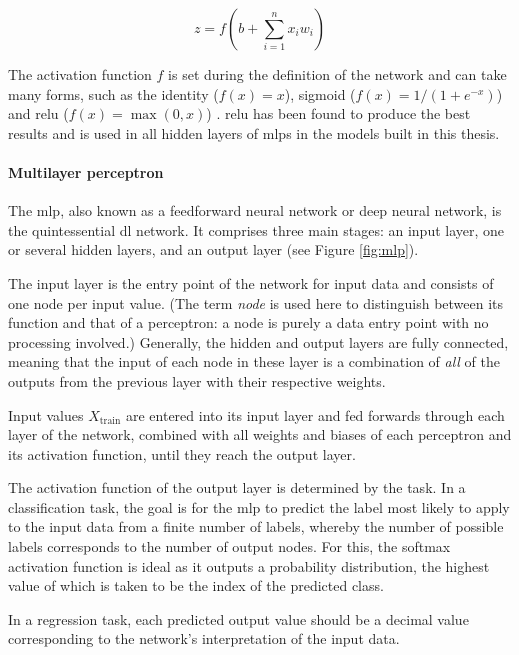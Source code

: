 \[
    z = f\left(b + \sum_{i = 1}^{n}x_{i}w_{i}\right)
\]



The activation function \(f\) is set during the definition of the network and can take many forms, such as the identity (\(f\left(x\right) = x\)), sigmoid (\(f\left(x\right) = 1 / \left(1 + e^{-x}\right)\)) and \ac{relu} (\(f\left(x\right) = \max\left(0, x\right)\)) \cite[]{hahnloser_digital_2000}. \ac{relu} has been found to produce the best results \cite[]{jarrett_what_2009} and is used in all hidden layers of \ac{mlp}s in the models built in this thesis.

\paragraph{Multilayer perceptron}
The \ac{mlp}, also known as a feedforward neural network or deep neural network, is the quintessential \ac{dl} network. It comprises three main stages: an input layer, one or several hidden layers, and an output layer (see Figure \ref{fig:mlp}).



The input layer is the entry point of the network for input data and consists of one node per input value. (The term \textit{node} is used here to distinguish between its function and that of a perceptron: a node is purely a data entry point with no processing involved.) Generally, the hidden and output layers are fully connected, meaning that the input of each node in these layer is a combination of \textit{all} of the outputs from the previous layer with their respective weights.

Input values \(X_{\text{train}}\) are entered into its input layer and fed forwards through each layer of the network, combined with all weights and biases of each perceptron and its activation function, until they reach the output layer.

The activation function of the output layer is determined by the task. In a classification task, the goal is for the \ac{mlp} to predict the label most likely to apply to the input data from a finite number of labels, whereby the number of possible labels corresponds to the number of output nodes. For this, the softmax activation function is ideal \cite[p. 184]{goodfellow_deep_2016} as it outputs a probability distribution, the highest value of which is taken to be the index of the predicted class.

In a regression task, each predicted output value should be a decimal value corresponding to the network's interpretation of the input data.


